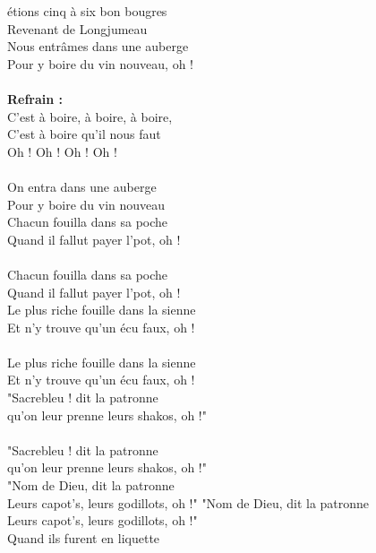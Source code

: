 
 étions cinq à six bon bougres
\\Revenant de Longjumeau
\\Nous entrâmes dans une auberge
\\Pour y boire du vin nouveau, oh !
\\\\\textbf{Refrain :}
\\C'est à boire, à boire, à boire,
\\C'est à boire qu'il nous faut
\\Oh ! Oh ! Oh ! Oh !
\\\\On entra dans une auberge
\\Pour y boire du vin nouveau
\\Chacun fouilla dans sa poche
\\Quand il fallut payer l'pot, oh !
\\\\Chacun fouilla dans sa poche
\\Quand il fallut payer l'pot, oh !
\\Le plus riche fouille dans la sienne
\\Et n'y trouve qu'un écu faux, oh !
\\\\Le plus riche fouille dans la sienne
\\Et n'y trouve qu'un écu faux, oh !
\\"Sacrebleu ! dit la patronne
\\qu'on leur prenne leurs shakos, oh !"
\\\\"Sacrebleu ! dit la patronne
\\qu'on leur prenne leurs shakos, oh !"
\\"Nom de Dieu, dit la patronne
\\Leurs capot's, leurs godillots, oh !"
\breakpage
"Nom de Dieu, dit la patronne
\\Leurs capot's, leurs godillots, oh !"
\\Quand ils furent en liquette
